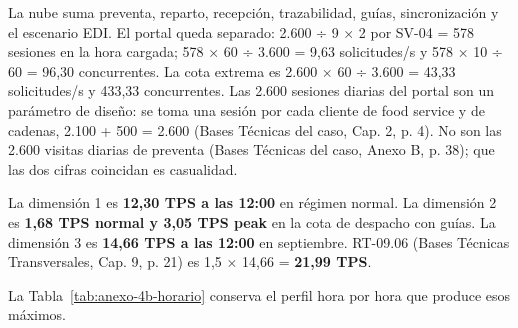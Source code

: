 La nube suma preventa, reparto, recepción, trazabilidad, guías, sincronización y el escenario EDI. El portal queda separado: 2.600 ÷ 9 × 2 por SV-04 = 578 sesiones en la hora cargada; 578 × 60 ÷ 3.600 = 9,63 solicitudes/s y 578 × 10 ÷ 60 = 96,30 concurrentes. La cota extrema es 2.600 × 60 ÷ 3.600 = 43,33 solicitudes/s y 433,33 concurrentes. Las 2.600 sesiones diarias del portal son un parámetro de diseño: se toma una sesión por cada cliente de food service y de cadenas, 2.100 + 500 = 2.600 (Bases Técnicas del caso, Cap. 2, p. 4). No son las 2.600 visitas diarias de preventa (Bases Técnicas del caso, Anexo B, p. 38); que las dos cifras coincidan es casualidad.

La dimensión 1 es \textbf{12,30 TPS a las 12:00} en régimen normal. La dimensión 2 es \textbf{1,68 TPS normal y 3,05 TPS peak} en la cota de despacho con guías. La dimensión 3 es \textbf{14,66 TPS a las 12:00} en septiembre. RT-09.06 (Bases Técnicas Transversales, Cap. 9, p. 21) es 1,5 × 14,66 = \textbf{21,99 TPS}.

La Tabla~\ref{tab:anexo-4b-horario} conserva el perfil hora por hora que produce esos máximos.

